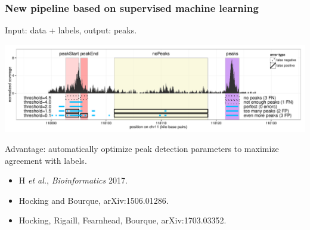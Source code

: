 \documentclass{beamer}
\DeclareMathOperator*{\PoissonLoss}{PoissonLoss}
\newcommand{\RR}{\mathbb R}
\newcommand{\ZZ}{\mathbb Z}
\begin{document}
\begin{frame}
  \frametitle{New pipeline based on supervised machine learning}
  Input: data + labels, output: peaks.

  \includegraphics[width=\textwidth]{figure-PeakError.pdf}

  Advantage: automatically optimize peak detection parameters to
  maximize agreement with labels.
  \begin{itemize}
  \item H {\it et al.}, {\it Bioinformatics} 2017.
  \item Hocking and Bourque, arXiv:1506.01286. 
  \item Hocking, Rigaill, Fearnhead, Bourque, arXiv:1703.03352. 
  \end{itemize}
\end{frame}





\end{document}
